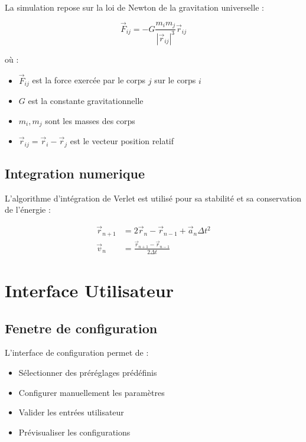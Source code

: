 \documentclass[12pt,a4paper]{article}
\begin{document}
La simulation repose sur la loi de Newton de la gravitation universelle :

\begin{equation}
\vec{F}_{ij} = -G \frac{m_i m_j}{|\vec{r}_{ij}|^3} \vec{r}_{ij}
\end{equation}

où :
\begin{itemize}
    \item $\vec{F}_{ij}$ est la force exercée par le corps $j$ sur le corps $i$
    \item $G$ est la constante gravitationnelle
    \item $m_i, m_j$ sont les masses des corps
    \item $\vec{r}_{ij} = \vec{r}_i - \vec{r}_j$ est le vecteur position relatif
\end{itemize}

\subsection{Integration numerique}

L'algorithme d'intégration de Verlet est utilisé pour sa stabilité et sa conservation de l'énergie :

\begin{align}
\vec{r}_{n+1} &= 2\vec{r}_n - \vec{r}_{n-1} + \vec{a}_n \Delta t^2\\
\vec{v}_n &= \frac{\vec{r}_{n+1} - \vec{r}_{n-1}}{2\Delta t}
\end{align}

\section{Interface Utilisateur}

\subsection{Fenetre de configuration}

L'interface de configuration permet de :

\begin{itemize}
    \item Sélectionner des préréglages prédéfinis
    \item Configurer manuellement les paramètres
    \item Valider les entrées utilisateur
    \item Prévisualiser les configurations
\end{itemize}
\end{document}
